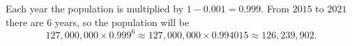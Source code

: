 Each year the population is multiplied by $1-0.001=0.999$. From $2015$ to $2021$ there are $6$ years, so the population will be
\[
127{,}000{,}000\times0.999^6\approx127{,}000{,}000\times0.994015\approx\boxed{126{,}239{,}902}.
\]
